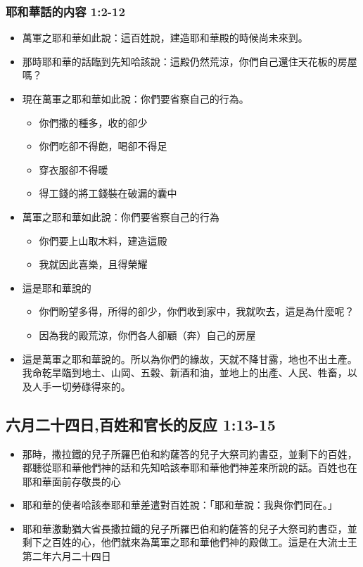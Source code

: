 \subsubsection{耶和華話的内容 1:2-12}
\begin{itemize} 
\itemsep-.35em 
\item 萬軍之耶和華如此說：這百姓說，建造耶和華殿的時候尚未來到。
\item 那時耶和華的話臨到先知哈該說：這殿仍然荒涼，你們自己還住天花板的房屋嗎？ 
\item 現在萬軍之耶和華如此說：你們要省察自己的行為。
\begin{itemize} 
\itemsep-.35em 
\item 你們撒的種多，收的卻少
\item 你們吃卻不得飽，喝卻不得足
\item 穿衣服卻不得暖
\item 得工錢的將工錢裝在破漏的囊中
\end{itemize}
\item 萬軍之耶和華如此說：你們要省察自己的行為
\begin{itemize} 
\itemsep-.35em 
\item 你們要上山取木料，建造這殿
\item 我就因此喜樂，且得榮耀
\end{itemize}
\item 這是耶和華說的
\begin{itemize} 
\itemsep-.35em 
\item 你們盼望多得，所得的卻少，你們收到家中，我就吹去，這是為什麼呢？
\item 因為我的殿荒涼，你們各人卻顧（奔）自己的房屋
\end{itemize}
\item 這是萬軍之耶和華說的。所以為你們的緣故，天就不降甘露，地也不出土產。我命乾旱臨到地土、山岡、五穀、新酒和油，並地上的出產、人民、牲畜，以及人手一切勞碌得來的。
\end{itemize}



\subsection{六月二十四日,百姓和官长的反应 1:13-15}
\begin{itemize} 
\itemsep-.35em 
\item 那時，撒拉鐵的兒子所羅巴伯和約薩答的兒子大祭司約書亞，並剩下的百姓，都聽從耶和華他們神的話和先知哈該奉耶和華他們神差來所說的話。百姓也在耶和華面前存敬畏的心
\item 耶和華的使者哈該奉耶和華差遣對百姓說：「耶和華說：我與你們同在。」
\item 耶和華激動猶大省長撒拉鐵的兒子所羅巴伯和約薩答的兒子大祭司約書亞，並剩下之百姓的心，他們就來為萬軍之耶和華他們神的殿做工。這是在大流士王第二年六月二十四日
\end{itemize}


